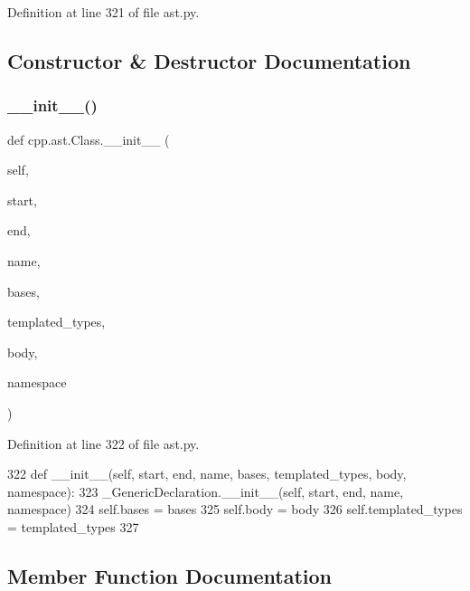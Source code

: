 Definition at line 321 of file ast.\+py.



\subsection{Constructor \& Destructor Documentation}
\mbox{\label{classcpp_1_1ast_1_1Class_acc17c34512d5cc54d5125734ce79f219}} 
\subsubsection{\texorpdfstring{\+\_\+\+\_\+init\+\_\+\+\_\+()}{\_\_init\_\_()}}
{\footnotesize\ttfamily def cpp.\+ast.\+Class.\+\_\+\+\_\+init\+\_\+\+\_\+ (\begin{DoxyParamCaption}\item[{}]{self,  }\item[{}]{start,  }\item[{}]{end,  }\item[{}]{name,  }\item[{}]{bases,  }\item[{}]{templated\+\_\+types,  }\item[{}]{body,  }\item[{}]{namespace }\end{DoxyParamCaption})}



Definition at line 322 of file ast.\+py.


\begin{DoxyCode}
322     \textcolor{keyword}{def }\_\_init\_\_(self, start, end, name, bases, templated\_types, body, namespace):
323         \_GenericDeclaration.\_\_init\_\_(self, start, end, name, namespace)
324         self.bases = bases
325         self.body = body
326         self.templated\_types = templated\_types
327 
\end{DoxyCode}


\subsection{Member Function Documentation}
\mbox{\label{classcpp_1_1ast_1_1Class_a0a63f6fab75d61ffac6fb9f1c29ae84d}} 
